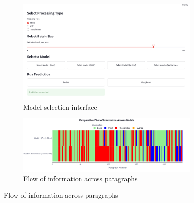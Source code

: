 \documentclass[runningheads]{llncs}
\begin{document}
\begin{figure}
	\centering
	\begin{subfigure}[b]{0.48\textwidth}
		\centering
		\includegraphics[width=\textwidth]{images/buttons.png}
		\caption{Model selection interface}
	\end{subfigure}
	\hfill
	\begin{subfigure}[b]{0.48\textwidth}
		\centering
		\includegraphics[width=\textwidth]{images/comparitive-v3.png}
		\caption{Flow of information across paragraphs}
	\end{subfigure}


\end{figure}
\end{document}
